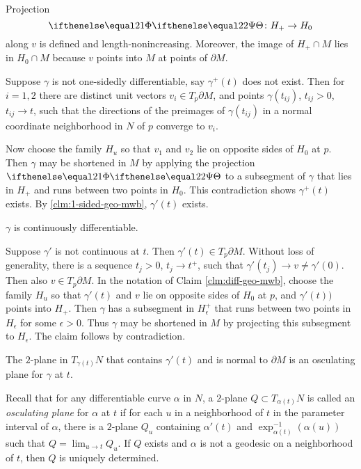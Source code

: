 Projection 
$$\map[2]\:H_+ \to H_0$$
 along $v$ is defined and length-nonincreasing.  Moreover, the image of $H_+\cap M$ lies in $H_0\cap M$ because $v$ points into $M$ at points of $\partial M$.

Suppose $\gamma$ is not one-sidedly differentiable, say $\gamma^+(t)$ does not exist.  Then for $i=1,2$ there are distinct unit vectors $v_i \in T_p\partial M$, and points $\gamma(t_{ij})$, $t_{ij}>0$, $t_{ij}\to t$, such that the directions of the preimages of $\gamma(t_{ij})$ in a normal coordinate neighborhood in $N$ of $p$  converge to $v_i$.

Now choose the family $H_u$ so that $v_1$ and $v_2$ lie on opposite sides of $H_0$ at $p$.  Then $\gamma$ may be shortened in $M$ by applying the projection $\map[2]$ to a subsegment of $\gamma$ that lies in $H_+$ and runs between two points in $H_0$.  This contradiction shows $\gamma^+(t)$ exists. By \ref{clm:1-sided-geo-mwb}, $\gamma'(t)$  exists.

\begin{clm}{}\label{clm:C^1-geo-mwb}
$\gamma$ is continuously differentiable. 
\end{clm}

 Suppose $\gamma'$ is not continuous at $t$. Then $\gamma'(t)\in T_p\partial M$. Without loss of generality, there is a sequence $t_j>0$, $t_j\to t^+$, such that  $\gamma'(t_j)\to v\ne \gamma'(0)$.  Then also $v\in T_p\partial M$. In the notation of Claim \ref{clm:diff-geo-mwb}, choose the family $H_u$ so that $\gamma'(t)$ and $v$ lie on opposite sides of $H_0$ at $p$, and $\gamma'(t))$ points into $H_+$.  Then $\gamma$ has a subsegment in $H_\epsilon^+$ that runs between two points in $H_\epsilon$ for some $\epsilon>0$.   
 Thus $\gamma$ may be shortened in $M$ by projecting this subsegment to $H_\epsilon$.  The claim follows by contradiction.

  
\begin{clm}{}\label{clm:C^1-geo-mwb}
 The $2$-plane in $T_{\gamma(t)}N$ that contains $\gamma'(t)$ and is normal to $\partial M$ is an osculating plane for $\gamma$ at $t$.
\end{clm}

Recall that for any differentiable curve $\alpha$ in $N$, a $2$-plane $Q\subset T_{\alpha(t)}N$ is called  an \emph{osculating plane} for $\alpha$ at $t$ if for each $u$ in a neighborhood of $t$ in the parameter interval of $\alpha$, there is a  $2$-plane $Q_u$ containing $\alpha'(t)$ and $\exp _{\alpha(t)}^{-1} (\alpha(u))$ such that $Q=\lim_{u\to t}Q_u$.  If $Q$ exists and $\alpha$ is not a geodesic on a neighborhood of $t$,  then $Q$ is uniquely determined. 

